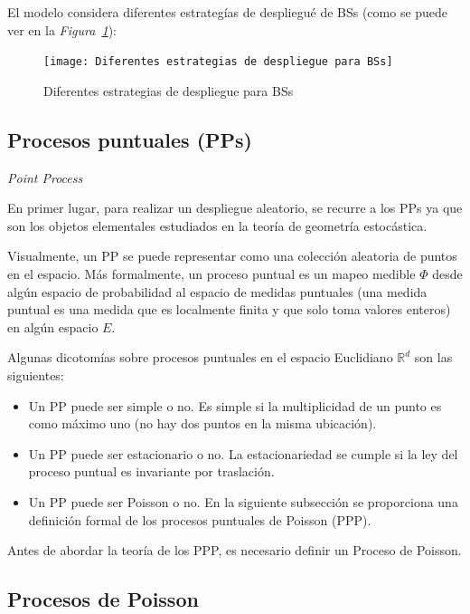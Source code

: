 El modelo considera diferentes estrategías de despliegué de BSs (como se puede ver en la \textit{Figura~\ref{fig:BSs}}):

\begin{figure}[th]
\centering
\texttt{[image: Diferentes estrategias de despliegue para BSs]}
\decoRule
\caption[Diferentes estrategias de despliegue para BSs]{Diferentes estrategias de despliegue para BSs}
\label{fig:BSs}
\end{figure}

\subsection{Procesos puntuales (PPs)}
\textit{Point Process} \parencite{Haenggi2009}\newline

En primer lugar, para realizar un despliegue aleatorio, se recurre a los PPs ya que son los objetos elementales estudiados en la teoría de geometría estocástica.\newline

Visualmente, un PP se puede representar como una colección aleatoria de puntos en el espacio. Más formalmente, un proceso puntual es un mapeo medible $\Phi$ desde algún espacio de probabilidad al espacio de medidas puntuales (una medida puntual es una medida que es localmente finita y que solo toma valores enteros) en algún espacio $E$.\newline

Algunas dicotomías sobre procesos puntuales en el espacio Euclidiano $\mathbb{R}^{d}$ son las siguientes:\newline

\begin{itemize}
    \item Un PP puede ser simple o no. Es simple si la multiplicidad de un punto es como máximo uno (no hay dos puntos en la misma ubicación).
    \item Un PP puede ser estacionario o no. La estacionariedad se cumple si la ley del proceso puntual es invariante por traslación.
    \item Un PP puede ser Poisson o no. En la siguiente subsección se proporciona una definición formal de los procesos puntuales de Poisson (PPP).
\end{itemize}

Antes de abordar la teoría de los PPP, es necesario definir un Proceso de Poisson. \newline

\subsection{Procesos de Poisson}

